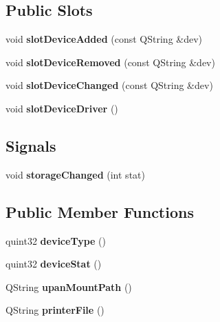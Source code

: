 \subsection*{Public Slots}
\begin{DoxyCompactItemize}
\item 
\mbox{\label{class_q_qt_plugin_watcher_a68ea9f1343fdc062bebd0ac8967d625e}} 
void {\bfseries slot\+Device\+Added} (const Q\+String \&dev)
\item 
\mbox{\label{class_q_qt_plugin_watcher_ae3a390974c181bebc21faa8d37ef3a53}} 
void {\bfseries slot\+Device\+Removed} (const Q\+String \&dev)
\item 
\mbox{\label{class_q_qt_plugin_watcher_aa6f7782415cdaf6fbf5fa1c13d076afb}} 
void {\bfseries slot\+Device\+Changed} (const Q\+String \&dev)
\item 
\mbox{\label{class_q_qt_plugin_watcher_a822b6aa0505119487ac4754af4169875}} 
void {\bfseries slot\+Device\+Driver} ()
\end{DoxyCompactItemize}
\subsection*{Signals}
\begin{DoxyCompactItemize}
\item 
\mbox{\label{class_q_qt_plugin_watcher_a3064b11fe94c8bc2ae3487171dcbe980}} 
void {\bfseries storage\+Changed} (int stat)
\end{DoxyCompactItemize}
\subsection*{Public Member Functions}
\begin{DoxyCompactItemize}
\item 
\mbox{\label{class_q_qt_plugin_watcher_adcf1572c74244b89880dec8af088c3c8}} 
quint32 {\bfseries device\+Type} ()
\item 
\mbox{\label{class_q_qt_plugin_watcher_a774219b586b166b711bb85e68b29005e}} 
quint32 {\bfseries device\+Stat} ()
\item 
\mbox{\label{class_q_qt_plugin_watcher_a54b9267b1a9cabe40685ebb6d106b877}} 
Q\+String {\bfseries upan\+Mount\+Path} ()
\item 
\mbox{\label{class_q_qt_plugin_watcher_aeab625154018777042ca6220f2bd7ca3}} 
Q\+String {\bfseries printer\+File} ()
\end{DoxyCompactItemize}
